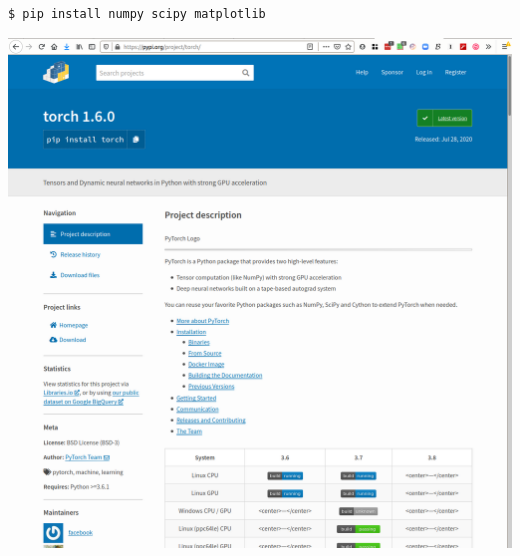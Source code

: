 \begin{frame}[fragile]
  \begin{example}[Installation]
    \begin{lstlisting}[language={},numbers=none]
$ pip install numpy scipy matplotlib
    \end{lstlisting}
  \end{example}
\end{frame}

\begin{frame}
  \includegraphics[width=\columnwidth]{figs/pypi-torch.png}
\end{frame}

